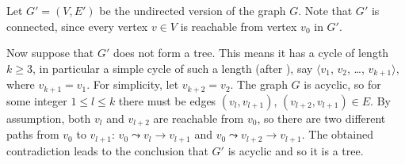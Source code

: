 Let $G'=(V,E')$ be the undirected version of the graph $G$.
Note that $G'$ is connected, since every vertex $v\in V$ is reachable from vertex $v_0$ in $G'$.

Now suppose that $G'$ does not form a tree.
This means it has a cycle of length $k\ge3$, in particular a simple cycle of such a length (after ), say $\langle v_1$, $v_2$, \dots, $v_{k+1}\rangle$, where $v_{k+1}=v_1$.
For simplicity, let $v_{k+2}=v_2$.
The graph $G$ is acyclic, so for some integer $1\le l\le k$ there must be edges $(v_l,v_{l+1})$, $(v_{l+2},v_{l+1})\in E$.
By assumption, both $v_l$ and $v_{l+2}$ are reachable from $v_0$, so there are two different paths from $v_0$ to $v_{l+1}$: $v_0\leadsto v_l\to v_{l+1}$ and $v_0\leadsto v_{l+2}\to v_{l+1}$.
The obtained contradiction leads to the conclusion that $G'$ is acyclic and so it is a tree.
